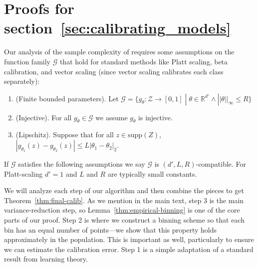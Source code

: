 \newpage
\section{Proofs for section~\ref{sec:calibrating_models}}
\label{sec:calibrating_models_appendix}

\newcommand{\G}[0]{\ensuremath{\mathcal{G}}}

Our analysis of the sample complexity of \ourcal{} requires some assumptions on the function family $\G{}$ that hold for standard methods like Platt scaling, beta calibration, and vector scaling (since vector scaling calibrates each class separately):

\begin{enumerate}
\item (Finite bounded parameters). Let $\G{} = \{ g_{\theta} : \mathcal{Z} \to [0, 1] \; | \; \theta \in \mathbb{R}^{d'} \wedge ||\theta||_{\infty} \leq R \}$
\item (Injective). For all $g_{\theta} \in \G{}$ we assume $g_{\theta}$ is injective.
\item (Lipschitz). Suppose that for all $z \in \mbox{supp}(Z)$, $|g_{\theta_1}(z) - g_{\theta_2}(z)| \leq L|\theta_1 - \theta_2|_2$.
\end{enumerate}

If $\G{}$ satisfies the following assumptions we say $\G{}$ is $(d', L, R)$-compatible. For Platt-scaling $d' = 1$ and $L$ and $R$ are typically small constants.

We will analyze each step of our algorithm and then combine the pieces to get Theorem~\ref{thm:final-calib}.
As we mention in the main text, step 3 is the main variance-reduction step, so Lemma~\ref{thm:empirical-binning} is one of the core parts of our proof.
Step 2 is where we construct a binning scheme so that each bin has an equal number of points---we show that this property holds approximately in the population.
This is important as well, particularly to ensure we can estimate the calibration error.
Step 1 is a simple adaptation of a standard result from learning theory.



